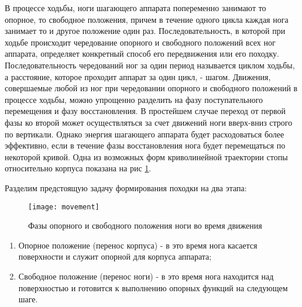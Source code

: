 В процессе ходьбы, ноги шагающего аппарата попеременно занимают то опорное, то свободное положения, причем в течение одного цикла каждая нога занимает то и другое положение один раз. Последовательность, в которой при ходьбе происходит чередование опорного и свободного положений всех ног аппарата, определяет конкретный способ его передвижения или его походку. Последовательность чередований ног за один период называется циклом ходьбы, а расстояние, которое проходит аппарат за один цикл, - шагом\cite{Nakano}.
Движения, совершаемые любой из ног при чередовании опорного и свободного положений в процессе ходьбы, можно упрощенно разделить на фазу поступательного перемещения и фазу восстановления. В простейшем случае переход от первой фазы ко второй может осуществляться за счет движений ноги вверх-вниз строго по вертикали. Однако энергия шагающего аппарата будет расходоваться более эффективно, если в течение фазы восстановления нога будет перемещаться по некоторой кривой. Одна из возможных форм криволинейной траектории стопы относительно корпуса показана на рис \ref{movement}. 

Разделим предстоящую задачу формирования походки на два этапа:


\begin{figure}[h!]
	\begin{center}
		\texttt{[image: movement]}
		\caption{Фазы опорного и свободного положения ноги во время движения}
		\label{movement}
	\end{center}
\end{figure}


\begin{enumerate} 
	\item Опорное положение (перенос корпуса) - в это время нога касается поверхности и служит опорной для корпуса аппарата;
	\item Свободное положение (перенос ноги) - в это время нога находится над поверхностью и готовится к выполнению опорных функций на следующем шаге.
\end{enumerate}

